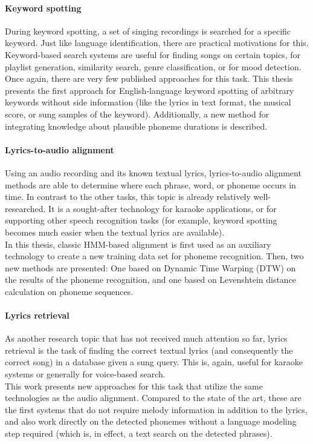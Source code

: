 \paragraph{Keyword spotting}
During keyword spotting, a set of singing recordings is searched for a specific keyword. Just like language identification, there are practical motivations for this. Keyword-based search systems are useful for finding songs on certain topics, for playlist generation, similarity search, genre classification, or for mood detection.\\
Once again, there are very few published approaches for this task. This thesis presents the first approach for English-language keyword spotting of arbitrary keywords without side information (like the lyrics in text format, the musical score, or sung samples of the keyword). Additionally, a new method for integrating knowledge about plausible phoneme durations is described.

\paragraph{Lyrics-to-audio alignment}
Using an audio recording and its known textual lyrics, lyrics-to-audio alignment methods are able to determine where each phrase, word, or phoneme occurs in time. In contrast to the other tasks, this topic is already relatively well-researched. It is a sought-after technology for karaoke applications, or for supporting other speech recognition tasks (for example, keyword spotting becomes much easier when the textual lyrics are available).\\
In this thesis, classic HMM-based alignment is first used as an auxiliary technology to create a new training data set for phoneme recognition. Then, two new methods are presented: One based on Dynamic Time Warping (DTW) on the results of the phoneme recognition, and one based on Levenshtein distance calculation on phoneme sequences.

\paragraph{Lyrics retrieval}
As another research topic that has not received much attention so far, lyrics retrieval is the task of finding the correct textual lyrics (and consequently the correct song) in a database given a sung query. This is, again, useful for karaoke systems or generally for voice-based search.\\
This work presents new approaches for this task that utilize the same technologies as the audio alignment. Compared to the state of the art, these are the first systems that do not require melody information in addition to the lyrics, and also work directly on the detected phonemes without a language modeling step required (which is, in effect, a text search on the detected phrases).\\


